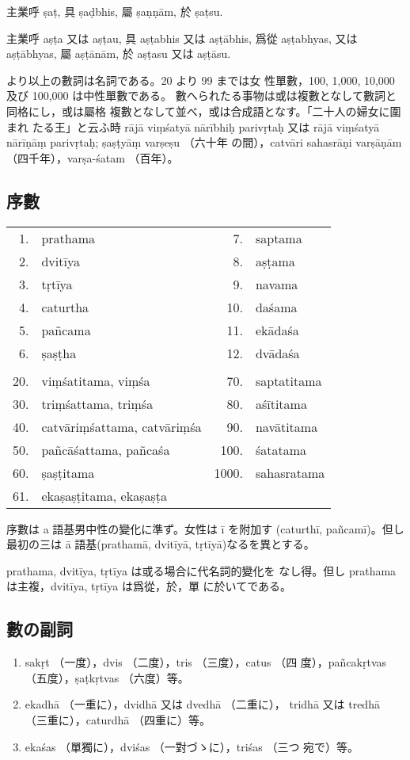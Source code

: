 主業呼 ṣaṭ, 具 ṣaḍbhis, 屬 ṣaṇṇām, 於 ṣaṭsu.

主業呼 aṣṭa 又は aṣṭau, 具 aṣṭabhis 又は aṣṭābhis, 爲從
aṣṭabhyas, 又は aṣṭābhyas, 屬 aṣṭānām, 於 aṣṭasu 又は
aṣṭāsu.

 より以上の數詞は名詞である。20 より 99 までは女
性單數，100, 1,000, 10,000 及び 100,000 は中性單數である。
數へられたる事物は或は複數となして數詞と同格にし，或は屬格
複數となして並べ，或は合成語となす。「二十人の婦女に圍まれ
たる王」と云ふ時 rājā viṃśatyā nārībhiḥ parivṛtaḥ 又は
rājā viṃśatyā nārīṇāṃ parivṛtaḥ; ṣaṣṭyāṃ varṣeṣu （六十年
の間），catvāri sahasrāṇi varṣāṇām （四千年），varṣa-śatam
（百年）。

\subsection{序數}
\numberParagraph
\begin{longtable}{rlrl}
 1. & prathama &  7. & saptama \\
 2. & dvitīya  &  8. & aṣṭama \\
 3. & tṛtīya   &  9. & navama \\
 4. & caturtha & 10. & daśama \\
 5. & pañcama  & 11. & ekādaśa \\
 6. & ṣaṣṭha   & 12. & dvādaśa \\
\\
20. & viṃśatitama, viṃśa          &   70. & saptatitama \\
30. & triṃśattama, triṃśa         &   80. & aśītitama \\
40. & catvāriṃśattama, catvāriṃśa &   90. & navātitama \\
50. & pañcāśattama, pañcaśa       &  100. & śatatama \\
60. & ṣaṣṭitama                   & 1000. & sahasratama \\
61. & ekaṣaṣṭitama, ekaṣaṣṭa      &       & \\
\end{longtable}

\numberParagraph
序數は a 語基男中性の變化に準ず。女性は ī を附加す
(caturthī, pañcamī)。但し最初の三は ā 語基(prathamā,
dvitīyā, tṛtīyā)なるを異とする。

\numberParagraph
prathama, dvitīya, tṛtīya は或る場合に代名詞的變化を
なし得。但し prathama は主複，dvitīya, tṛtīya は爲從，於，單
に於いてである。

\subsection{數の副詞}
\numberParagraph
\begin{enumerate}[label=(\alph*)]
\item sakṛt （一度），dvis （二度），tris （三度），catus （四
度），pañcakṛtvas （五度），ṣaṭkṛtvas （六度）等。
\item ekadhā （一重に），dvidhā 又は dvedhā （二重に），
tridhā 又は tredhā （三重に），caturdhā （四重に）等。
\item ekaśas （單獨に），dviśas （一對づゝに），triśas （三つ
宛で）等。
\end{enumerate}

